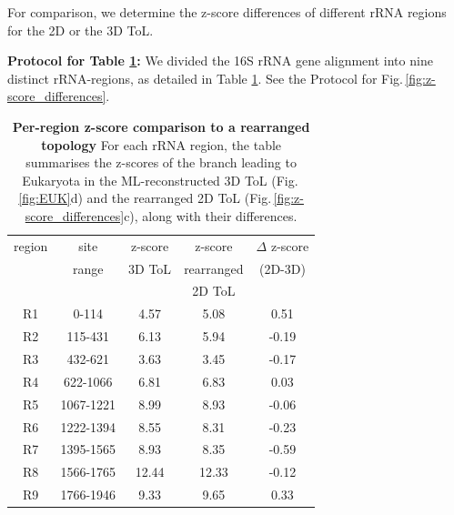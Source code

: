 \begin{appendices}
For comparison,  we  determine  the z-score differences of different rRNA regions for the 2D or the 3D ToL.

\medskip

\noindent  \textbf{Protocol for  Table \ref{supptab:rRNA_2D_3D}:} We divided the 16S rRNA gene alignment into nine distinct rRNA-regions, as detailed in Table \ref{supptab:rRNA_2D_3D}. See the Protocol for Fig.\,\ref{fig:z-score_differences}.

\medskip

\begin{table}[ht]
    \centering
    \begin{tabular}{|c|c|c|c|c|}
\hline
region&site& z-score & z-score& $\Delta$ z-score\\
&range&3D ToL & rearranged & (2D-3D)\\
&& & 2D ToL & \\
\hline
R1&0-114&4.57&5.08&0.51\\
R2&115-431&6.13&5.94&-0.19\\
R3&432-621&3.63&3.45&-0.17\\
R4&622-1066&6.81&6.83&0.03\\
R5&1067-1221&8.99&8.93&-0.06\\
R6&1222-1394&8.55&8.31&-0.23\\
R7&1395-1565&8.93&8.35&-0.59\\
R8&1566-1765&12.44&12.33&-0.12\\
R9&1766-1946&9.33&9.65&0.33\\
\hline
    \end{tabular}
    \vspace{0.25cm}
    \caption{\textbf{Per-region z-score comparison to a rearranged topology} For each rRNA region, the table summarises the z-scores of the branch leading to Eukaryota in the ML-reconstructed 3D ToL (Fig.\,\ref{fig:EUK}d) and the rearranged 2D ToL (Fig.\,\ref{fig:z-score_differences}c), along with their differences.}
    \label{supptab:rRNA_2D_3D}
    \end{table}


\end{appendices}